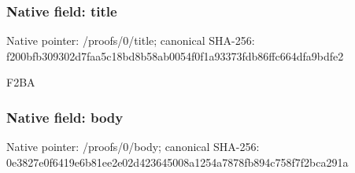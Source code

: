 \documentclass[10pt,a4paper]{article}
\begin{document}
\subsubsection{Native field: title}


Native pointer: /proofs/0/title; canonical SHA-256: f200bfb309302d7faa5c18bd\allowbreak{}8b58ab0054f0f1a93373fdb8\allowbreak{}6ffc664dfa9bdfe2


F2BA


\subsubsection{Native field: body}


Native pointer: /proofs/0/body; canonical SHA-256: 0e3827e0f6419e6b81ee2e02\allowbreak{}d423645008a1254a7878fb89\allowbreak{}4c758f7f2bca291a
\end{document}
